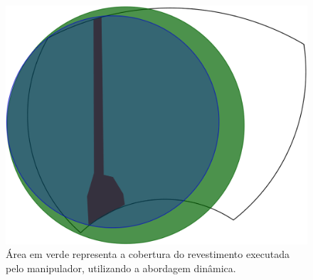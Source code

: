 \begin{figure}[h!]	
	\centering
	\includegraphics[width=0.5\columnwidth]{detail/figs/dinamica/workspaceTorques.png}
	\caption{Área em verde representa a cobertura do revestimento executada pelo
	manipulador, utilizando a abordagem dinâmica.}
	\label{fig::wdin}
\end{figure}